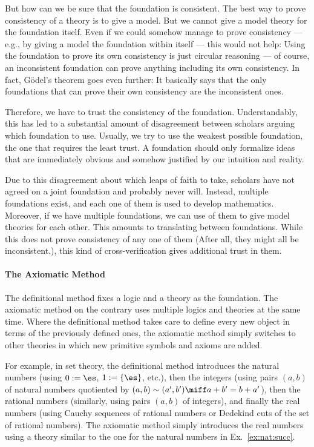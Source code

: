 But how can we be sure that the foundation is consistent. The best way to prove consistency of a theory is to give a model. But we cannot give a model theory for the foundation itself. Even if we could somehow manage to prove consistency --- e.g., by giving a model the foundation within itself --- this would not help: Using the foundation to prove its own consistency is just circular reasoning --- of course, an inconsistent foundation can prove anything including its own consistency. In fact, G\"odel's theorem goes even further: It basically says that the only foundations that can prove their own consistency are the inconsistent ones.

Therefore, we have to trust the consistency of the foundation. Understandably, this has led to a substantial amount of disagreement between scholars arguing which foundation to use. Usually, we try to use the weakest possible foundation, the one that requires the least trust. A foundation should only formalize ideas that are immediately obvious and somehow justified by our intuition and reality.

Due to this disagreement about which leaps of faith to take, scholars have not agreed on a joint foundation and probably never will. Instead, multiple foundations exist, and each one of them is used to develop mathematics. Moreover, if we have multiple foundations, we can use of them to give model theories for each other. This amounts to translating between foundations. While this does not prove consistency of any one of them (After all, they might all be inconsistent.), this kind of cross-verification gives additional trust in them.

\paragraph{The Axiomatic Method}
The definitional method fixes a logic and a theory as the foundation. The axiomatic method on the contrary uses multiple logics and theories at the same time.
Where the definitional method takes care to define every new object in terms of the previously defined ones, the axiomatic method simply switches to other theories in which new primitive symbols and axioms are added.

For example, in set theory, the definitional method introduces the natural numbers (using $0:=\es$, $1:=\{\es\}$, etc.), then the integers (using pairs $(a,b)$ of natural numbers quotiented by $(a,b)\sim (a',b') \miff a+b'=b+a'$), then the rational numbers (similarly, using pairs $(a,b)$ of integers), and finally the real numbers (using Cauchy sequences of rational numbers or Dedekind cuts of the set of rational numbers).
The axiomatic method simply introduces the real numbers using a theory similar to the one for the natural numbers in Ex.~\ref{ex:nat:succ}.

